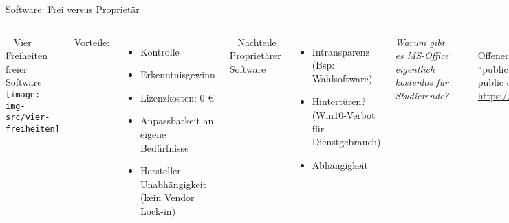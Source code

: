 \documentclass[t]{beamer}
\begin{document}
\begin{frame}[label=wb]{\color{fg}Software: Frei versus Proprietär}

\begin{columns}


~
Vier Freiheiten freier Software\\[4mm]
\texttt{[image: img-src/vier-freiheiten]}
\pause

Vorteile:
\begin{itemize}
\item Kontrolle
\item Erkenntnisgewinn
\item Lizenzkosten: 0 €
\item Anpassbarkeit an eigene Bedürfnisse
\item Hersteller-Unabhängigkeit\\[-2mm] {\tiny (kein Vendor Lock-in)}

\end{itemize}


~ 
Nachteile Proprietärer Software
\begin{itemize}
 \item Intransparenz {\tiny (Bsp: Wahlsoftware)}
 \item Hintertüren? {\tiny (Win10-Verbot für Dienstgebrauch)}
 \item Abhängigkeit
\end{itemize}
 \pause
 \bigskip
 
 
 \textit{Warum gibt es MS-Office eigentlich { kostenlos} für Studierende?}
 
 \pause
 \pause
 \medskip
 \rule{\textwidth}{1pt}\\[2mm]
 Offener Brief:\\
 
 "`public money $\Rightarrow$ public code"'\\[2mm]
 
 \url{https://publiccode.eu}


\end{columns}



\end{frame}

\end{document}
